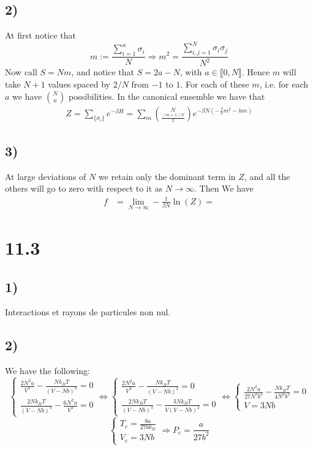 \documentclass[10pt,a4paper]{book}
\begin{document}
\subsection*{2)}
At first notice that 
$$m:=\frac{\sum_{i=1}^n\sigma_i}{N} \Rightarrow m^2=\frac{\sum_{i,j=1}^N\sigma_i\sigma_j}{N^2}$$
Now call $S=Nm$, and notice that $S=2a-N$, with $a\in\llbracket 0,N\rrbracket$. Hence $m$ will take $N+1$ values spaced by $2/N$ from $-1$ to $1$. For each of these $m$, i.e. for each $a$ we have $\binom{N}{a}$ possibilities. In the canonical ensemble we have that 
\begin{align*}
Z=\sum_{\{\sigma_i\}} e^{-\beta H}=\sum_{m} \binom{N}{\frac{(m+1)N}{2}}e^{-\beta N(-\frac{J}{2}m^2-hm)}
\end{align*}

\subsection*{3)}
At large deviations of $N$ we retain only the dominant term in $Z$, and all the others will go to zero with respect to it as $N\to\infty$. Then 
We have
\begin{align*}
f&=\lim_{N\to\infty}-\frac{1}{\beta N}\ln(Z)
=
\end{align*}





\section*{11.3}
\subsection*{1)}
Interactions et rayons de particules non nul.

\subsection*{2)}
We have the following:
\[
\begin{cases}
\frac{2N^2 a}{V^3} - \frac{N k_B T}{(V - N b)^2} = 0\\
\frac{2 N k_B T}{(V - N b)^3} - \frac{6 N^2 a}{V^4} = 0
\end{cases}
\Leftrightarrow 
\begin{cases}
\frac{2N^2 a}{V^3} - \frac{N k_B T}{(V - N b)^2} = 0\\
\frac{2 N k_B T}{(V - N b)^3} - \frac{3 N k_B T}{V ( V - N b)^2} = 0
\end{cases}
\Leftrightarrow 
\begin{cases}
\frac{2N^2 a}{27 N^3 b^3} - \frac{N k_B T}{4 N^2 b^2} = 0\\
V = 3 N b
\end{cases}
\]
\[
\begin{cases}
T_c = \frac{8 a}{27 b k_B}\\
V_c = 3 N b
\end{cases} \Rightarrow P_c = \frac{a}{27 b^2}
\]
\end{document}

